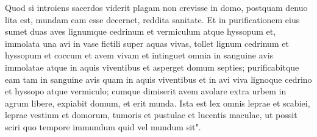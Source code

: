 \begin{biblechapter}
\verse Quod si introiens sacerdos viderit plagam non crevisse in domo, postquam denuo lita est, mundam eam esse decernet, reddita sanitate. 
\verse Et in purificationem eius sumet duas aves lignumque cedrinum et vermiculum atque hyssopum 
\verse et, immolata una avi in vase fictili super aquas vivas, 
\verse tollet lignum cedrinum et hyssopum et coccum et avem vivam et intinguet omnia in sanguine avis immolatae atque in aquis viventibus et asperget domum septies;  
\verse purificabitque eam tam in sanguine avis quam in aquis viventibus et in avi viva lignoque cedrino et hyssopo atque vermiculo; 
\verse cumque dimiserit avem avolare extra urbem in agrum libere, expiabit domum, et erit munda. 
\verse Ista est lex omnis leprae et scabiei, 
\verse leprae vestium et domorum,  
\verse tumoris et pustulae et lucentis maculae, 
\verse ut possit sciri quo tempore immundum quid vel mundum sit". 
\end{biblechapter}

